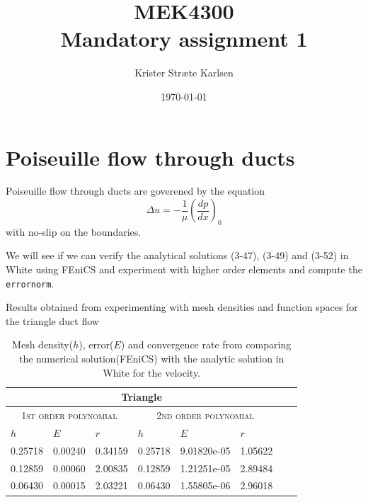\documentclass[11pt,a4paper,english]{article}
\title{MEK4300\\Mandatory assignment 1}
\author{Krister Stræte Karlsen}
\date{\today}
\numberwithin{equation}{section}
\begin{document}
\maketitle

\section{Poiseuille flow through ducts}

Poiseuille flow through ducts are goverened by the equation 
\begin{equation}
\Delta u = -\frac{1}{\mu}\left( \frac{dp}{dx} \right)_0  
\end{equation}
with no-slip on the boundaries.  

We will see if we can verify the analytical solutions (3-47), (3-49) and (3-52) in White using FEniCS and experiment with higher order elements and compute the \texttt{errornorm}. 

Results obtained from experimenting with mesh densities and function spaces for the triangle duct flow

\begin{table}[H]
\centering
\caption{Mesh density($h$), error($E$) and convergence rate from comparing the numerical solution(FEniCS) with the analytic solution in White for the velocity. }
\vspace{3mm}
\begin{tabular}{|l|l|l|l|l|l|l|l|}
\hline
 \multicolumn{6}{|c|}{\textbf{Triangle}}   \\
\hline
 \multicolumn{3}{|c|}{ \textsc{1st order polynomial}} &  \multicolumn{3}{|c|}{\textsc{2nd order polynomial}}  \\
\hline
$h$ & $E$ & $r$ & $h$ & $E$ & $r$   \\
\hline
0.25718 & 0.00240 & 0.34159	& 0.25718 & 9.01820e-05 & 1.05622 \\
0.12859 & 0.00060 & 2.00835	& 0.12859 & 1.21251e-05 & 2.89484 \\
0.06430 & 0.00015 & 2.03221 & 0.06430 & 1.55805e-06 & 2.96018	\\ 
\hline
\end{tabular}
\label{tab:time}
\end{table}
\end{document}
